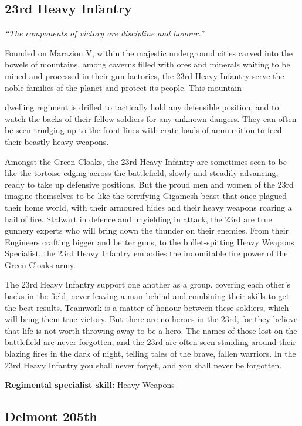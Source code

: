 \subsection{23rd Heavy Infantry}

\textit{``The components of victory are discipline and honour.''}

Founded on Marazion V, within the majestic underground cities carved into the bowels of mountains, among caverns filled with ores and minerals waiting to be mined and processed in their gun factories, the 23rd Heavy Infantry serve the noble families of the planet and protect its people. This mountain-

dwelling regiment is drilled to tactically hold any defensible position, and to watch the backs of their fellow soldiers for any unknown dangers. They can often be seen trudging up to the front lines with crate-loads of ammunition to feed their beastly heavy weapons.

Amongst the Green Cloaks, the 23rd Heavy Infantry are sometimes seen to be like the tortoise edging across the battlefield, slowly and steadily advancing, ready to take up defensive positions. But the proud men and women of the 23rd imagine themselves to be like the terrifying Gigamesh beast that once plagued their home world, with their armoured hides and their heavy weapons roaring a hail of fire. Stalwart in defence and unyielding in attack, the 23rd are true gunnery experts who will bring down the thunder on their enemies. From their Engineers crafting bigger and better guns, to the bullet-spitting Heavy Weapons Specialist, the 23rd Heavy Infantry embodies the indomitable fire power of the Green Cloaks army.

The 23rd Heavy Infantry support one another as a group, covering each other's backs in the field, never leaving a man behind and combining their skills to get the best results. Teamwork is a matter of honour between these soldiers, which will bring them true victory. But there are no heroes in the 23rd, for they believe that life is not worth throwing away to be a hero. The names of those lost on the battlefield are never forgotten, and the 23rd are often seen standing around their blazing fires in the dark of night, telling tales of the brave, fallen warriors. In the 23rd Heavy Infantry you shall never forget, and you shall never be forgotten.

\textbf{Regimental specialist skill:} Heavy Weapons

\subsection{Delmont 205th}

